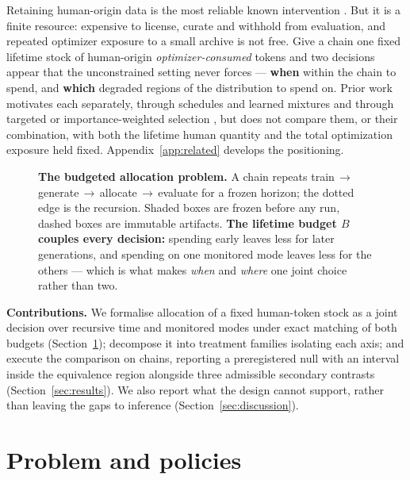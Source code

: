 \documentclass{article}
\begin{document}
Retaining human-origin data is the most reliable known intervention
\cite{gerstgrasser2024inevitable,seddik2024synthetic}. But it is a finite resource:
expensive to license, curate and withhold from evaluation, and repeated optimizer exposure
to a small archive is not free. Give a chain one fixed lifetime stock of human-origin
\emph{optimizer-consumed} tokens and two decisions appear that the unconstrained setting
never forces --- \textbf{when} within the chain to spend, and \textbf{which} degraded
regions of the distribution to spend on. Prior work motivates each separately, through
schedules and learned mixtures \cite{xie2023doremi,liu2025regmix,zhao2026regmixd} and
through targeted or importance-weighted selection
\cite{xie2023dsir,ash2020badge,liu2021jtt}, but does not compare them, or their
combination, with both the lifetime human quantity and the total optimization exposure held
fixed. Appendix~\ref{app:related} develops the positioning.

\begin{figure}[t]
\centering

\caption{\textbf{The budgeted allocation problem.} A chain repeats
train\,$\rightarrow$\,generate\,$\rightarrow$\,allocate\,$\rightarrow$\,evaluate for a
frozen horizon; the dotted edge is the recursion. Shaded boxes are frozen before any run,
dashed boxes are immutable artifacts. \textbf{The lifetime budget $B$ couples every
decision:} spending early leaves less for later generations, and spending on one monitored
mode leaves less for the others --- which is what makes \emph{when} and \emph{where} one
joint choice rather than two.}
\label{fig:pipeline}
\end{figure}

\textbf{Contributions.} We formalise allocation of a fixed human-token stock as a joint
decision over recursive time and monitored modes under exact matching of both budgets
(Section~\ref{sec:problem}); decompose it into treatment families isolating each axis; and
execute the comparison on \PilotChains{} chains, reporting a preregistered null with an
interval inside the equivalence region alongside three admissible secondary contrasts
(Section~\ref{sec:results}). We also report what the design cannot support, rather than
leaving the gaps to inference (Section~\ref{sec:discussion}).

\section{Problem and policies}
\label{sec:problem}
\end{document}

